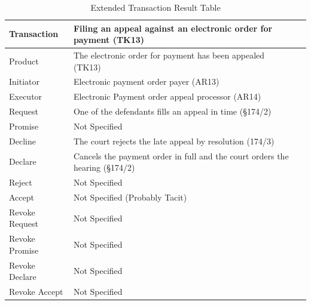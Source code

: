 \begin{landscape}
\begin{table}[h]
\caption{Extended Transaction Result Table}
\label{tab:etrt}
\begin{tabular}{|l||l|l|}
\hline
Transaction  &  Filing an appeal against an electronic order for payment (TK13) \\ \hline
Product      &  The electronic order for payment has been appealed (TK13) \\ \hline
Initiator      &  Electronic payment order payer (AR13) \\ \hline
Executor       & Electronic Payment order appeal processor (AR14) \\ \hline
Request        & One of the defendants fills an appeal in time (\S174/2)
  \\ \hline
Promise        &    Not Specified   \\ \hline
Decline        & The court rejects the late appeal by resolution (174/3)  \\ \hline
Declare        &  Cancels the payment order in full and the court orders the hearing (\S174/2)  \\ \hline
Reject         &  Not Specified   \\ \hline
Accept         & Not Specified (Probably Tacit) \\ \hline
Revoke Request & Not Specified \\ \hline
Revoke Promise & Not Specified  \\ \hline
Revoke Declare & Not Specified      \\ \hline
Revoke Accept  &  Not Specified \\ \hline
\end{tabular}
\end{table}


\end{landscape}
